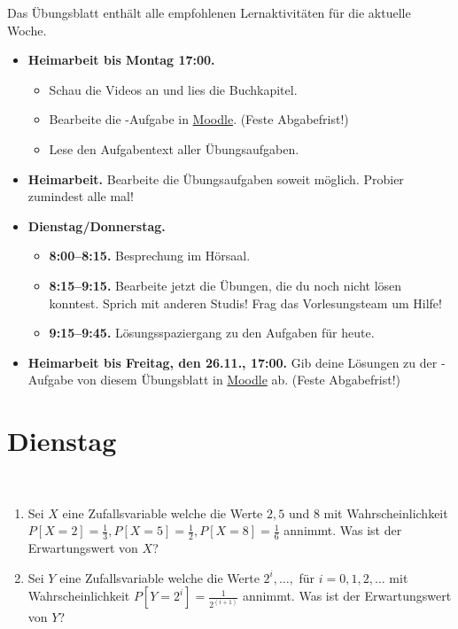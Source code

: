 \documentclass{uebung_cs}
\begin{document}
Das Übungsblatt enthält alle empfohlenen Lernaktivitäten für die aktuelle Woche.

\begin{itemize}
\item \textbf{Heimarbeit bis Montag 17:00.}
    \begin{itemize}
    \item 
    Schau die Videos an und lies die Buchkapitel.
    \item Bearbeite die -Aufgabe in \href{https://moodle.studiumdigitale.uni-frankfurt.de/moodle/course/view.php?id=2241}{Moodle}. (Feste Abgabefrist!)
    \item Lese den Aufgabentext aller Übungsaufgaben.
    \end{itemize}
\item \textbf{Heimarbeit.} Bearbeite die Übungsaufgaben soweit möglich. Probier zumindest alle mal!
\item \textbf{Dienstag/Donnerstag.}
\begin{itemize}
    \item \textbf{8:00--8:15.} Besprechung im Hörsaal.
    \item \textbf{8:15--9:15.} Bearbeite jetzt die Übungen, die du noch nicht lösen konntest. Sprich mit anderen Studis! Frag das Vorlesungsteam um Hilfe!
    \item \textbf{9:15--9:45.} Lösungsspaziergang zu den Aufgaben für heute.
\end{itemize}

\item \textbf{Heimarbeit bis Freitag, den 26.11., 17:00.} Gib deine Lösungen zu der -Aufgabe von diesem Übungsblatt in \href{https://moodle.studiumdigitale.uni-frankfurt.de/moodle/course/view.php?id=2241}{Moodle} ab. (Feste Abgabefrist!)
\end{itemize}

\section*{Dienstag}

\begin{aufgabe}[Erwartungswerte]\
	\begin{enumerate}
		\item Sei $X$ eine Zufallsvariable welche die Werte $2,5$ und $8$ mit Wahrscheinlichkeit $P[X=2] = \frac{1}{3}, P[X=5]=\frac{1}{2}, P[X=8] = \frac{1}{6}$ annimmt. Was ist der Erwartungswert von $X$?\\
		
		\item Sei $Y$ eine Zufallsvariable welche die Werte $2^i,\dots,$ für $i = 0,1,2,\dots$ mit Wahrscheinlichkeit $P[Y=2^i] = \frac{1}{2^{(i+1)}}$ annimmt. Was ist der Erwartungswert von $Y$?
	\end{enumerate}	
\end{aufgabe}
\end{document}
